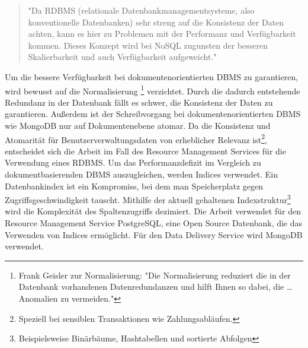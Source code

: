 \begin{quote}
"Da RDBMS (relationale Datenbankmanagementsysteme, also konventionelle Datenbanken) sehr streng
auf die Konsistenz der Daten achten, kann es hier zu Problemen mit der Performanz und Verfügbarkeit
kommen. Dieses Konzept wird bei NoSQL zugunsten der besseren Skalierbarkeit und auch Verfügbarkeit
aufgeweicht."\cite[S. 18]{NoSQLClemensGull}
\end{quote}

Um die bessere Verfügbarkeit bei dokumentenorientierten DBMS zu garantieren, wird bewusst auf die Normalisierung
\footnote{Frank Geisler zur Normalisierung: "Die Normalisierung reduziert die in der Datenbank vorhandenen Datenredundanzen und hilft Ihnen so dabei, die \dots Anomalien zu vermeiden."\cite[S. 177]{DatenbankenFrankGeisler}}
verzichtet. Durch die dadurch entstehende Redundanz in der Datenbank fällt es schwer,
die Konsistenz der Daten zu garantieren. Außerdem ist der Schreibvorgang bei dokumentenorientierten
DBMS wie MongoDB nur auf Dokumentenebene atomar.\cite{MongoDBAtomaritaet} Da die Konsistenz und Atomarität für
Benutzerverwaltungsdaten von erheblicher Relevanz ist\footnote{Speziell bei sensiblen Transaktionen wie Zahlungsabläufen.}, 
entscheidet sich die Arbeit im Fall des Resource Management Services für die Verwendung eines RDBMS.
Um das Performanzdefizit im Vergleich zu dokumentbasierenden DBMS auszugleichen,
werden Indices verwendet. Ein Datenbankindex ist ein Kompromiss, bei dem
man Speicherplatz gegen Zugriffsgeschwindigkeit tauscht.\cite{YoutubePostgresIndexing}
Mithilfe der aktuell gehaltenen Indexstruktur\footnote{Beispielsweise Binärbäume, Hashtabellen und sortierte Abfolgen}
wird die Komplexität des Spaltenzugriffs dezimiert. Die Arbeit verwendet für den Resource Management Service
PostgreSQL, eine Open Source Datenbank, die das Verwenden von Indices ermöglicht. Für den Data Delivery Service
wird MongoDB verwendet. 

